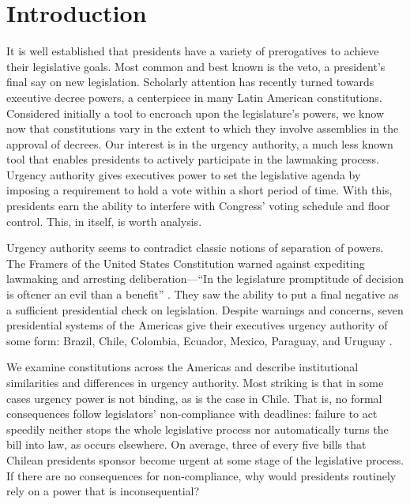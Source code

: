 \documentclass[letter,12pt]{article}
\begin{document}
\newpage

\doublespacing

\section{Introduction}

\noindent It is well established that presidents have a variety of prerogatives to achieve their legislative goals. Most common and best known is the veto, a president's final say on new legislation. Scholarly attention has recently turned towards executive decree powers, a centerpiece in many Latin American constitutions. Considered initially a tool to encroach upon the legislature's powers, we know now that constitutions vary in the extent to which they involve assemblies in the approval of decrees. Our interest is in the urgency authority, a much less known tool that enables presidents to actively participate in the lawmaking process. Urgency authority gives executives power to set the legislative agenda by imposing a requirement to hold a vote within a short period of time. With this, presidents earn the ability to interfere with Congress' voting schedule and floor control. This, in itself, is worth analysis.

Urgency authority seems to contradict classic notions of separation of powers. The Framers of the United States Constitution warned against expediting lawmaking and arresting deliberation---``In the legislature promptitude of decision is oftener an evil than a benefit'' \citep{hamilton70.1788}. They saw the ability to put a final negative as a sufficient presidential check on legislation. Despite warnings and concerns, seven presidential systems of the Americas give their executives urgency authority of some form: Brazil, Chile, Colombia, Ecuador, Mexico, Paraguay, and Uruguay \citep{morgenstern.nacif.2002,garcia.montero.presidentes.2009}.

We examine constitutions across the Americas and describe institutional similarities and differences in urgency authority. Most striking is that in some cases urgency power is not binding, as is the case in Chile. That is, no formal consequences follow legislators' non-compliance with deadlines: failure to act speedily neither stops the whole legislative process nor automatically turns the bill into law, as occurs elsewhere. On average, three of every five bills that Chilean presidents sponsor become urgent at some stage of the legislative process. If there are no consequences for non-compliance, why would presidents routinely rely on a power that is inconsequential?
\end{document}

